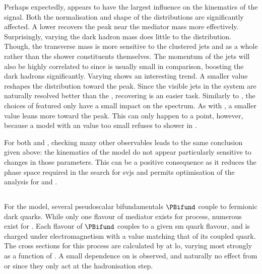 Perhaps expectedly, \mZprime appears to have the largest influence on the kinematics of the signal. Both the normalisation and shape of the distributions are significantly affected. A lower \mZprime recovers the peak near the mediator mass more effectively. Surprisingly, varying the dark hadron mass does little to the distribution. Though, the transverse mass is more sensitive to the clustered \glspl{jet} and \ptmiss as a whole rather than the shower constituents themselves. The momentum of the \glspl{jet} will also be highly correlated to \mZprime since \mDark is usually small in comparison, boosting the dark hadrons significantly. Varying \rinv shows an interesting trend. A smaller value reshapes the \mT distribution toward the \mZprime peak. Since the visible \glspl{jet} in the system are naturally resolved better than the \ptvecmiss, recovering \mZprime is an easier task. Similarly to \mDark, the choices of \aDark featured only have a small impact on the \mT spectrum. As with \rinv, a smaller value leans more toward the \mZprime peak. This can only happen to a point, however, because a model with an \aDark value too small refuses to shower in \PYTHIA.

For both \mDark and \aDark, checking many other observables leads to the same conclusion given above: the kinematics of the model do not appear particularly sensitive to changes in those parameters. This can be a positive consequence as it reduces the phase space required in the search for \glspl{svj} and permits optimisation of the analysis for \mZprime and \rinv.




\subsection{\texorpdfstring{\tchannel}{t-channel}}
\label{subsec:svj_signal_madgraph_tchannel}

For the \tchannel model, several pseudoscalar bifundamentals $\PBifund$ couple to fermionic dark quarks. While only one flavour of mediator exists for \schannel process, numerous exist for \tchannel. Each flavour of $\PBifund$ couples to a given \acrshort{sm} quark flavour, and is charged under electromagnetism with a value matching that of its coupled quark. The cross sections for this process are calculated by \madgraph at \acrshort{lo}, varying most strongly as a function of \mBifund. A small dependence on \mqdark is observed, and naturally no effect from \aDark or \rinv since they only act at the hadronisation step.

